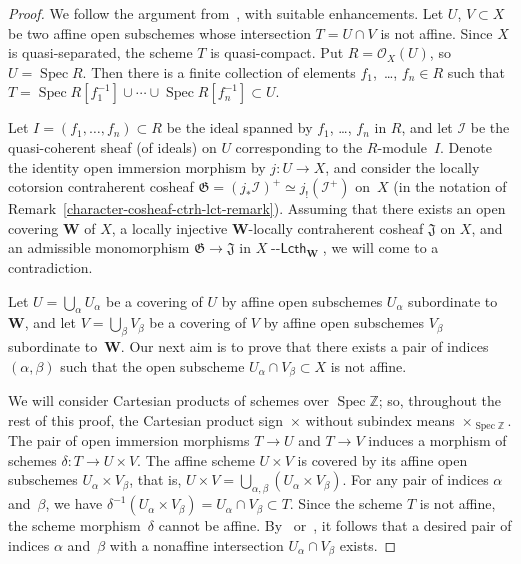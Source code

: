 \documentclass[12pt,a4paper]{amsart}
\newcommand{\+}{\nobreakdash-}
\renewcommand{\:}{\colon}
\newcommand{\rarrow}{\longrightarrow}
\DeclareMathOperator{\Spec}{Spec}
\newcommand{\Lcth}{{\operatorname{\mathsf{--Lcth}}}}
\newcommand{\bW}{\mathbf W}
\newcommand{\cO}{\mathcal O}
\newcommand{\cI}{\mathcal I}
\newcommand{\fG}{\mathfrak G}
\newcommand{\fJ}{\mathfrak J}
\newcommand{\boZ}{\mathbb Z}
\theoremstyle{plain}
\theoremstyle{definition}
\begin{document}
\begin{proof}
 We follow the argument from~\cite[proof of Theorem~2.2]{SS}, with
suitable enhancements.
 Let $U$, $V\subset X$ be two affine open subschemes whose intersection
$T=U\cap V$ is not affine.
 Since $X$ is quasi-separated, the scheme $T$ is quasi-compact.
 Put $R=\cO_X(U)$, so $U=\Spec R$.
 Then there is a finite collection of elements $f_1$,~\dots, $f_n\in R$
such that $T=\Spec R[f_1^{-1}]\cup\dotsb\cup\Spec R[f_n^{-1}]\subset U$.

 Let $I=(f_1,\dotsc,f_n)\subset R$ be the ideal spanned by $f_1$,
\dots, $f_n$ in $R$, and let $\cI$ be the quasi-coherent sheaf
(of ideals) on $U$ corresponding to the $R$\+module~$I$.
 Denote the identity open immersion morphism by $j\:U\rarrow X$,
and consider the locally cotorsion contraherent cosheaf
$\fG=(j_*\cI)^+\simeq j_!(\cI^+)$ on~$X$ (in the notation of
Remark~\ref{character-cosheaf-ctrh-lct-remark}).
 Assuming that there exists an open covering $\bW$ of $X$,
a locally injective $\bW$\+locally contraherent cosheaf $\fJ$ on $X$,
and an admissible monomorphism $\fG\rarrow\fJ$ in $X\Lcth_\bW$,
we will come to a contradiction.

 Let $U=\bigcup_\alpha U_\alpha$ be a covering of $U$ by affine open
subschemes $U_\alpha$ subordinate to $\bW$, and let $V=\bigcup_\beta
V_\beta$ be a covering of $V$ by affine open subschemes $V_\beta$
subordinate to~$\bW$.
 Our next aim is to prove that there exists a pair of indices
$(\alpha,\beta)$ such that the open subscheme $U_\alpha\cap V_\beta
\subset X$ is not affine.

 We will consider Cartesian products of schemes over $\Spec\boZ$;
so, throughout the rest of this proof, the Cartesian product
sign~$\times$ without subindex means $\times_{\Spec\boZ}$.
 The pair of open immersion morphisms $T\rarrow U$ and $T\rarrow V$
induces a morphism of schemes $\delta\:T\rarrow U\times V$.
 The affine scheme $U\times V$ is covered by its affine open
subschemes $U_\alpha\times V_\beta$, that is, $U\times V=
\bigcup_{\alpha,\beta}(U_\alpha\times V_\beta)$.
 For any pair of indices $\alpha$ and~$\beta$, we have
$\delta^{-1}(U_\alpha\times V_\beta)=U_\alpha\cap V_\beta\subset T$.
 Since the scheme $T$ is not affine, the scheme morphism~$\delta$
cannot be affine.
 By~\cite[D\'efinition~II.1.2.1 and Corollaire~II.1.3.2]{EGAII}
or~\cite[Lemma Tag~01S8]{SP}, it follows that a desired pair
of indices $\alpha$ and~$\beta$ with a nonaffine intersection
$U_\alpha\cap V_\beta$ exists.


\end{proof}
\end{document}
